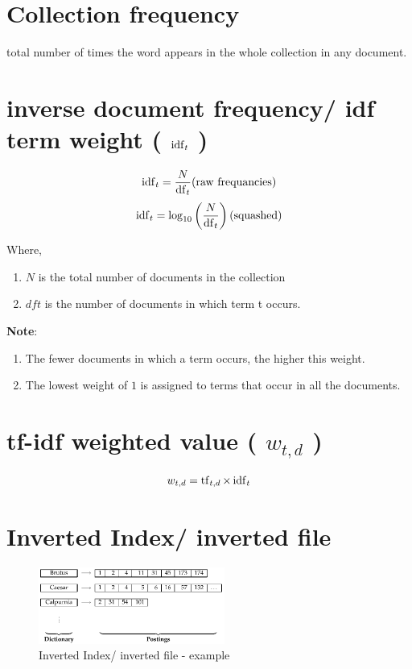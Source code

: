 \section{Collection frequency \cite{nlp-1}}\label{Collection frequency}
total number of times the word appears in the whole collection in any document.


\section{inverse document frequency/ idf term weight ( $\operatorname{idf}_t$ )}\label{inverse document frequency/ idf term weight}
\[
    \rcmdXidf_t = \displaystyle\dfrac{N}{\rcmdXdf_t} \hfill \text{(raw frequancies)}
\]
\[
    \rcmdXidf_t = \log_{10} \left(\displaystyle\dfrac{N}{\rcmdXdf_t} \right) \hfill \text{(squashed)}
\]

Where,
\begin{enumerate}
    \item $N$ is the total number of documents in the collection
    \item $dft$ is the number of documents in which term t occurs.
\end{enumerate}

\vspace{0.2cm}
\textbf{Note}:
\begin{enumerate}
    \item The fewer documents in which a term occurs, the higher this weight.

    \item The lowest weight of $1$ is assigned to terms that occur in all the documents.

    
\end{enumerate}


\section{tf-idf weighted value ( $w_{t,d}$ ) \cite{nlp-1}}\label{tf-idf weighted value: formula}
\[
    w_{t,d} = \operatorname{tf}_{t,d} \times\operatorname{idf}_t
\]

\section{Inverted Index/ inverted file \cite{ir-1}}\label{Inverted Index/ inverted file}

\begin{figure}[h]
    \centering
    \includegraphics[width=\linewidth, height=2.5cm, keepaspectratio]{Pictures/info-retrieval/inverted-index.png}
    \caption{Inverted Index/ inverted file - example}
\end{figure}

